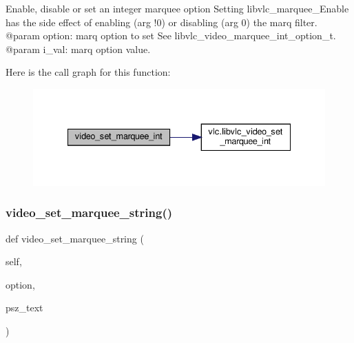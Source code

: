 \begin{DoxyVerb}Enable, disable or set an integer marquee option
Setting libvlc_marquee_Enable has the side effect of enabling (arg !0)
or disabling (arg 0) the marq filter.
@param option: marq option to set See libvlc_video_marquee_int_option_t.
@param i_val: marq option value.
\end{DoxyVerb}
 Here is the call graph for this function\+:
\nopagebreak
\begin{figure}[H]
\begin{center}
\leavevmode
\includegraphics[width=335pt]{classvlc_1_1_media_player_a61a708bed378528147fee7cceb4c4143_cgraph}
\end{center}
\end{figure}
\mbox{\label{classvlc_1_1_media_player_a492db72b13ac08ae28e4672ca1e8fd92}} 
\subsubsection{\texorpdfstring{video\+\_\+set\+\_\+marquee\+\_\+string()}{video\_set\_marquee\_string()}}
{\footnotesize\ttfamily def video\+\_\+set\+\_\+marquee\+\_\+string (\begin{DoxyParamCaption}\item[{}]{self,  }\item[{}]{option,  }\item[{}]{psz\+\_\+text }\end{DoxyParamCaption})}

